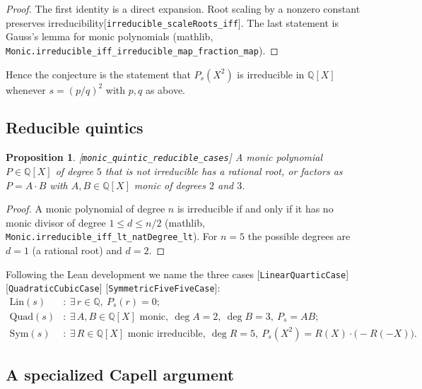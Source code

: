 \documentclass[10pt]{article}
\newtheorem{proposition}[theorem]{Proposition}
\theoremstyle{definition}
\theoremstyle{remark}
\newcommand{\Q}{\mathbb{Q}}
\newcommand{\leanref}[1]{{\scriptsize\textup{[\texttt{#1}]}}\allowbreak}
\begin{document}
\begin{proof}
The first identity is a direct expansion.  Root scaling by a nonzero constant
preserves irreducibility\leanref{irreducible\_\allowbreak scale\allowbreak Roots\_\allowbreak iff}.  The last
statement is Gauss's lemma for monic polynomials
(mathlib, \texttt{Monic.irreducible\_\allowbreak iff\_\allowbreak irreducible\_\allowbreak map\_\allowbreak fraction\_\allowbreak map}).
\end{proof}

Hence the conjecture is the statement that $P_s(X^2)$ is irreducible in
$\Q[X]$ whenever $s=(p/q)^2$ with $p,q$ as above.

\subsection{Reducible quintics}

\begin{proposition}\label{prop:quintic-cases}
\leanref{monic\_\allowbreak quintic\_\allowbreak reducible\_\allowbreak cases}
A monic polynomial $P\in\Q[X]$ of degree $5$ that is not irreducible has a
rational root, or factors as $P=A\cdot B$ with $A,B\in\Q[X]$ monic of degrees
$2$ and $3$.
\end{proposition}

\begin{proof}
A monic polynomial of degree $n$ is irreducible if and only if it has no monic
divisor of degree $1\le d\le n/2$
(mathlib, \texttt{Monic.irreducible\_\allowbreak iff\_\allowbreak lt\_\allowbreak nat\allowbreak Degree\_\allowbreak lt}).  For $n=5$ the
possible degrees are $d=1$ (a rational root) and $d=2$.
\end{proof}

Following the Lean development we name the three cases
\leanref{Linear\allowbreak Quartic\allowbreak Case} \leanref{Quadratic\allowbreak Cubic\allowbreak Case} \leanref{Symmetric\allowbreak Five\allowbreak Five\allowbreak Case}:
\begin{align*}
\mathrm{Lin}(s)&:\ \exists\,r\in\Q,\ P_s(r)=0;\\
\mathrm{Quad}(s)&:\ \exists\,A,B\in\Q[X]\text{ monic},\ \deg A=2,\ \deg B=3,\ P_s=AB;\\
\mathrm{Sym}(s)&:\ \exists\,R\in\Q[X]\text{ monic irreducible},\ \deg R=5,\
 P_s(X^2)=R(X)\cdot\bigl(-R(-X)\bigr).
\end{align*}

\subsection{A specialized Capell argument}
\end{document}
